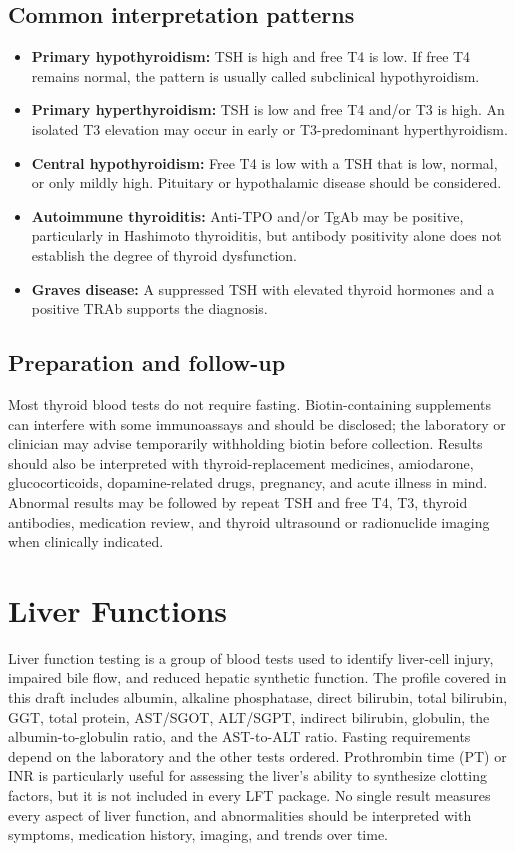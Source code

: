 \documentclass[11pt,openany]{book}
\begin{document}
\subsection*{Common interpretation patterns}
\begin{itemize}[leftmargin=*]
  \item \textbf{Primary hypothyroidism:} TSH is high and free T4 is low. If free T4 remains normal, the pattern is usually called subclinical hypothyroidism.
  \item \textbf{Primary hyperthyroidism:} TSH is low and free T4 and/or T3 is high. An isolated T3 elevation may occur in early or T3-predominant hyperthyroidism.
  \item \textbf{Central hypothyroidism:} Free T4 is low with a TSH that is low, normal, or only mildly high. Pituitary or hypothalamic disease should be considered.
  \item \textbf{Autoimmune thyroiditis:} Anti-TPO and/or TgAb may be positive, particularly in Hashimoto thyroiditis, but antibody positivity alone does not establish the degree of thyroid dysfunction.
  \item \textbf{Graves disease:} A suppressed TSH with elevated thyroid hormones and a positive TRAb supports the diagnosis.
\end{itemize}

\subsection*{Preparation and follow-up}
Most thyroid blood tests do not require fasting. Biotin-containing supplements can
interfere with some immunoassays and should be disclosed; the laboratory or
clinician may advise temporarily withholding biotin before collection. Results
should also be interpreted with thyroid-replacement medicines, amiodarone,
glucocorticoids, dopamine-related drugs, pregnancy, and acute illness in mind.
Abnormal results may be followed by repeat TSH and free T4, T3, thyroid
antibodies, medication review, and thyroid ultrasound or radionuclide imaging
when clinically indicated.

\section{Liver Functions}

Liver function testing is a group of blood tests used to identify liver-cell
injury, impaired bile flow, and reduced hepatic synthetic function. The profile
covered in this draft includes albumin, alkaline phosphatase, direct bilirubin,
total bilirubin, GGT, total protein, AST/SGOT, ALT/SGPT, indirect bilirubin,
globulin, the albumin-to-globulin ratio, and the AST-to-ALT ratio. Fasting
requirements depend on the laboratory and the other tests ordered.
Prothrombin time (PT) or INR is particularly useful for assessing the liver's
ability to synthesize clotting factors, but it is not included in every LFT
package. No single result measures every aspect of liver function, and
abnormalities should be interpreted with symptoms, medication history, imaging,
and trends over time.
\end{document}
